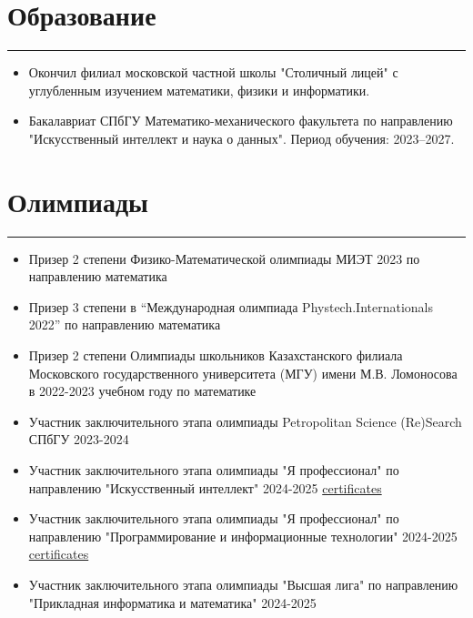 \documentclass[a4paper,14pt]{article}
\begin{document}
\section*{Образование}
\hrule
\vspace{0.5em}
\begin{itemize}
    \item Окончил филиал московской частной школы "Столичный лицей" с углубленным изучением математики, физики и информатики.
    \item Бакалавриат СПбГУ Математико-механического факультета по направлению "Искусственный интеллект и наука о данных". Период обучения: 2023–2027.
\end{itemize}

\section*{Олимпиады}
\hrule
\vspace{0.5em}
\begin{itemize}
    \item Призер 2 степени  Физико-Математической олимпиады МИЭТ 2023 по направлению математика
    \item Призер 3 степени в “Международная олимпиада Phystech.Internationals 2022” по направлению математика
    \item Призер 2 степени Олимпиады школьников Казахстанского филиала Московского государственного университета (МГУ) имени М.В. Ломоносова в 2022-2023 учебном году по математике
    \item Участник заключительного этапа олимпиады Petropolitan Science (Re)Search СПбГУ 2023-2024
    \item Участник заключительного этапа олимпиады "Я профессионал" по направлению "Искусственный интеллект" 2024-2025 \href{https://github.com/Denigmma/Practice_LogBook/blob/main/Yandex/Я%20профессионал%20(olimp)/2024-2025/certificates/ИИ(приглашение%20на%20заключительный%20этап).pdf}{certificates}
    \item Участник заключительного этапа олимпиады "Я профессионал" по направлению "Программирование и информационные технологии" 2024-2025 \href{https://github.com/Denigmma/Practice_LogBook/blob/main/Yandex/Я%20профессионал%20(olimp)/2024-2025/certificates/ПрогИнфТех(приглашение%20на%20заключительный%20этап).pdf}{certificates}
    \item Участник заключительного этапа олимпиады "Высшая лига" по направлению "Прикладная информатика и математика" 2024-2025
\end{itemize}
\end{document}
